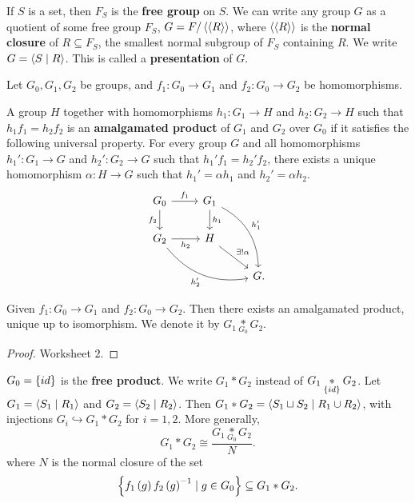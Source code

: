 \begin{definition*}
If $ S $ is a set, then $ F_S $ is the \textbf{free group} on $ S $. We can write any group $ G $ as a quotient of some free group $ F_S $, $ G = F / \left\langle \left\langle R \right\rangle \right\rangle $, where $ \left\langle \left\langle R \right\rangle \right\rangle $ is the \textbf{normal closure} of $ R \subseteq F_S $, the smallest normal subgroup of $ F_S $ containing $ R $. We write $ G = \left\langle S \mid R \right\rangle $. This is called a \textbf{presentation} of $ G $.
\end{definition*}

Let $ G_0, G_1, G_2 $ be groups, and $ f_1 : G_0 \to G_1 $ and $ f_2 : G_0 \to G_2 $ be homomorphisms.

\begin{definition*}
A group $ H $ together with homomorphisms $ h_1 : G_1 \to H $ and $ h_2 : G_2 \to H $ such that $ h_1f_1 = h_2f_2 $ is an \textbf{amalgamated product} of $ G_1 $ and $ G_2 $ over $ G_0 $ if it satisfies the following universal property. For every group $ G $ and all homomorphisms $ h_1' : G_1 \to G $ and $ h_2' : G_2 \to G $ such that $ h_1'f_1 = h_2'f_2 $, there exists a unique homomorphism $ \alpha : H \to G $ such that $ h_1' = \alpha h_1 $ and $ h_2' = \alpha h_2 $.
$$
\begin{tikzcd}
G_0 \arrow{r}{f_1} \arrow[swap]{d}{f_2} & G_1 \arrow{d}{h_1} \arrow[bend left=30]{ddr}{h_1'} & \\
G_2 \arrow[swap]{r}{h_2} \arrow[bend right=30, swap]{drr}{h_2'} & H \arrow{dr}{\exists !\alpha} & \\
& & G.
\end{tikzcd}
$$
\end{definition*}

\begin{theorem}
Given $ f_1 : G_0 \to G_1 $ and $ f_2 : G_0 \to G_2 $. Then there exists an amalgamated product, unique up to isomorphism. We denote it by
$ G_1 \underset{G_0}{*} G_2 $.
\end{theorem}

\begin{proof}
Worksheet $ 2 $.
\end{proof}


$ G_0 = \left\{ id \right\} $ is the \textbf{free product}. We write $ G_1 * G_2 $ instead of $ G_1 \underset{\left\{ id \right\}}{*} G_2 $. Let $ G_1 = \left\langle S_1 \mid R_1 \right\rangle $ and $ G_2 = \left\langle S_2 \mid R_2 \right\rangle $. Then $ G_1 * G_2 = \left\langle S_1 \sqcup S_2 \mid R_1 \cup R_2 \right\rangle $, with injections $ G_i \hookrightarrow G_1 * G_2 $ for $ i = 1, 2 $. More generally,
$$ G_1 * G_2 \cong \dfrac{G_1 \underset{G_0}{*} G_2}{N}. $$
where $ N $ is the normal closure of the set
$$ \left\{ f_1\left( g \right)f_2\left( g \right)^{-1} \mid g \in G_0 \right\} \subseteq G_1 * G_2. $$

